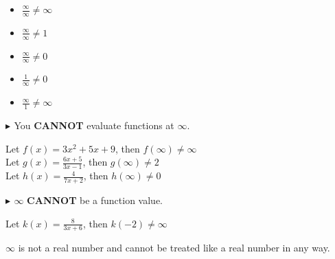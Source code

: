 \documentclass{ximera}
\begin{document}
\begin{example}


\begin{itemize}
\item $\frac{\infty}{\infty} \ne \infty$
\item $\frac{\infty}{\infty} \ne 1$
\item $\frac{\infty}{\infty} \ne 0$
\item $\frac{1}{\infty} \ne 0$
\item $\frac{\infty}{1} \ne \infty$
\end{itemize}


\end{example}








\textbf{\textcolor{red!90!darkgray}{$\blacktriangleright$ }} You \textbf{\textcolor{red!80!black}{CANNOT}} evaluate functions at $\infty$.



\begin{example}


Let $f(x) = 3x^2 + 5x + 9$, then $f(\infty) \ne \infty$ \\

Let $g(x) = \frac{6x + 5}{3x - 1}$, then $g(\infty) \ne 2$ \\

Let $h(x) = \frac{4}{7x + 2}$, then $h(\infty) \ne 0$ \\

\end{example}











\textbf{\textcolor{red!90!darkgray}{$\blacktriangleright$ }} $\infty$ \textbf{\textcolor{red!80!black}{CANNOT}} be a function value.



\begin{example}



Let $k(x) = \frac{8}{3x + 6}$, then $k(-2) \ne \infty$ \\

\end{example}

$\infty$ is not a real number and cannot be treated like a real number in any way.
\end{document}
